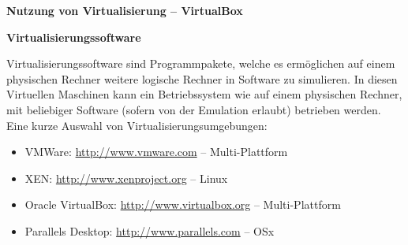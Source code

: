 \documentclass[paper=a4,fontsize=11pt]{scrartcl}%
\numberwithin{equation}{section}
\begin{document}
\begin{center}
\Large{\textbf{Nutzung von Virtualisierung -- VirtualBox}}
\end{center}
\begin{center}\Large{\textbf{Virtualisierungssoftware}}\end{center}\vskip0.25in
Virtualisierungssoftware sind Programmpakete, welche es ermöglichen auf einem physischen Rechner weitere logische Rechner in Software zu simulieren. In diesen Virtuellen Maschinen kann ein Betriebssystem wie auf einem physischen Rechner, mit beliebiger Software (sofern von der Emulation erlaubt) betrieben werden.\\
Eine kurze Auswahl von Virtualisierungsumgebungen:
\begin{itemize}
	\item VMWare: \url{http://www.vmware.com} -- Multi-Plattform
	\item XEN: \url{http://www.xenproject.org} -- Linux
	\item Oracle VirtualBox: \url{http://www.virtualbox.org} -- Multi-Plattform
	\item Parallels Desktop: \url{http://www.parallels.com} -- OSx
\end{itemize}
\end{document}
